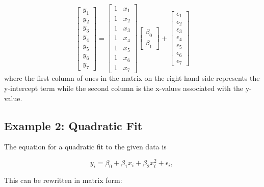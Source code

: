 \begin{equation}\label{eq:simpleRegressionMatrix}
  \begin{bmatrix}y_1 \\ y_2 \\ y_3 \\ y_4 \\ y_5 \\ y_6 \\ y_7 \end{bmatrix}
  =
  \begin{bmatrix}1 & x_1  \\1 & x_2  \\1 & x_3  \\1 & x_4  \\1 & x_5  \\1 & x_6 \\ 1 & x_7  \end{bmatrix}
  \begin{bmatrix} \beta_0 \\ \beta_1  \end{bmatrix}
  +
  \begin{bmatrix} \epsilon_1 \\ \epsilon_2 \\ \epsilon_3 \\ \epsilon_4 \\ \epsilon_5 \\ \epsilon_6 \\ \epsilon_7 \end{bmatrix}
\end{equation}
where the first column of ones in the matrix on the right hand side represents the y-intercept term while the second column is the x-values associated with the y-value.

\subsection{Example 2: Quadratic Fit}

The equation for a quadratic fit to the given data is

\begin{equation}
  y_i = \beta_0 + \beta_1 x_i + \beta_2 x_i^2 +\epsilon_i, \,
\end{equation}

This can be rewritten in matrix form:

